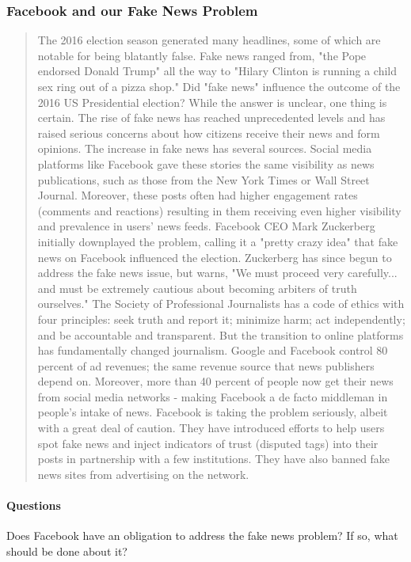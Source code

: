 \subsubsection{Facebook and our Fake News Problem \cite{1_fb}}
\label{sec:facebook}

\begin{quote}
  The 2016 election season generated many headlines, some of which are notable for being blatantly false. Fake news ranged from, "the Pope endorsed Donald Trump" all the way to "Hilary Clinton is running a child sex ring out of a pizza shop." Did "fake news" influence the outcome of the 2016 US Presidential election? While the answer is unclear, one thing is certain. The rise of fake news has reached unprecedented levels and has raised serious concerns about how citizens receive their news and form opinions. The increase in fake news has several sources. Social media platforms like Facebook gave these stories the same visibility as news publications, such as those from the New York Times or Wall Street Journal. Moreover, these posts often had higher engagement rates (comments and reactions) resulting in them receiving even higher visibility and prevalence in users' news feeds. Facebook CEO Mark Zuckerberg initially downplayed the problem, calling it a "pretty crazy idea" that fake news on Facebook influenced the election. Zuckerberg has since begun to address the fake news issue, but warns, "We must proceed very carefully... and must be extremely cautious about becoming arbiters of truth ourselves." The Society of Professional Journalists has a code of ethics with four principles: seek truth and report it; minimize harm; act independently; and be accountable and transparent. But the transition to online platforms has fundamentally changed journalism. Google and Facebook control 80 percent of ad revenues; the same revenue source that news publishers depend on. Moreover, more than 40 percent of people now get their news from social media networks - making Facebook a de facto middleman in people's intake of news. Facebook is taking the problem seriously, albeit with a great deal of caution. They have introduced efforts to help users spot fake news and inject indicators of trust (disputed tags) into their posts in partnership with a few institutions. They have also banned fake news sites from advertising on the network.
\end{quote}

\paragraph{Questions}{
  Does Facebook have an obligation to address the fake news problem? If so, what should be done about it?
}

